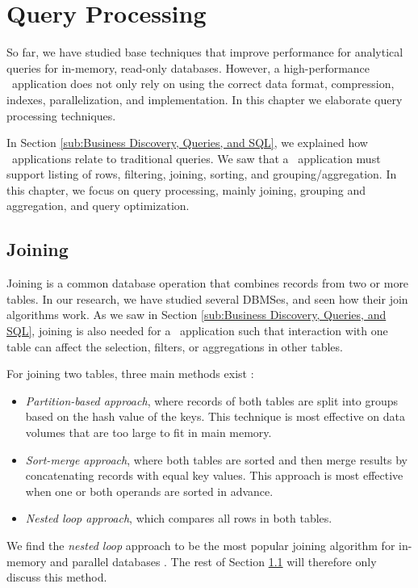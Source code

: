 \chapter{Query Processing}
\label{chap:Query Processing}
So far, we have studied base techniques that improve performance for analytical queries for in-memory, read-only databases. However, a high-performance \bd~application does not only rely on using the correct data format, compression, indexes, parallelization, and implementation. In this chapter we elaborate query processing techniques.

In Section \ref{sub:Business Discovery, Queries, and SQL}, we explained how \bd~applications relate to traditional queries. We saw that a \bd~application must support listing of rows, filtering, joining, sorting, and grouping/aggregation. In this chapter, we focus on query processing, mainly joining, grouping and aggregation, and query optimization.


\newpage

\section{Joining}
\label{sec:Joining}
Joining is a common database operation that combines records from two or more tables. In our research, we have studied several DBMSes, and seen how their join algorithms work. As we saw in Section \ref{sub:Business Discovery, Queries, and SQL}, joining is also needed for a \bd~application such that interaction with one table can affect the selection, filters, or aggregations in other tables.

For joining two tables, three main methods exist \cite{Bratbergsengen2015-ed}: 
\begin{itemize}
  \item \textit{Partition-based approach}, where records of both tables are split into groups based on the hash value of the keys. This technique is most effective on data volumes that are too large to fit in main memory.
  \item \textit{Sort-merge approach}, where both tables are sorted and then merge results by concatenating records with equal key values. This approach is most effective when one or both operands are sorted in advance.
  \item \textit{Nested loop approach}, which compares all rows in both tables.
\end{itemize}

We find the \textit{nested loop} approach to be the most popular joining algorithm for in-memory and parallel databases \cite{Boncz2002-yj}. The rest of Section \ref{sec:Joining} will therefore only discuss this method.

